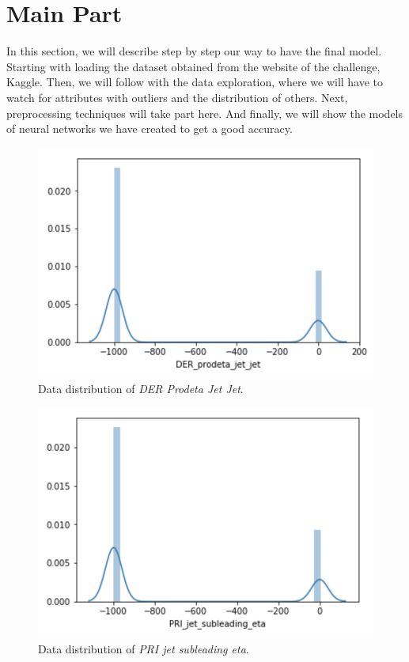 \documentclass[conference]{IEEEtran}
\begin{document}
\section{Main Part}
In this section, we will describe step by step our way to have the final model. Starting with loading the dataset obtained from the website of the challenge, Kaggle\cite{b2}. Then, we will follow with the data exploration, where we will have to watch for attributes with outliers and the distribution of others. Next, preprocessing techniques will take part here. And finally, we will show the models of neural networks we have created to get a good accuracy.
\begin{figure}[htbp]
\centerline{\includegraphics[width=\linewidth]{img1.png}}
\caption{Data distribution of \textit{DER Prodeta Jet Jet}.}
\label{fig}
\end{figure}
\begin{figure}[htbp]
\centerline{\includegraphics[width=\linewidth]{img2.png}}
\caption{Data distribution of \textit{PRI jet subleading eta}.}
\label{fig}
\end{figure}
\end{document}
